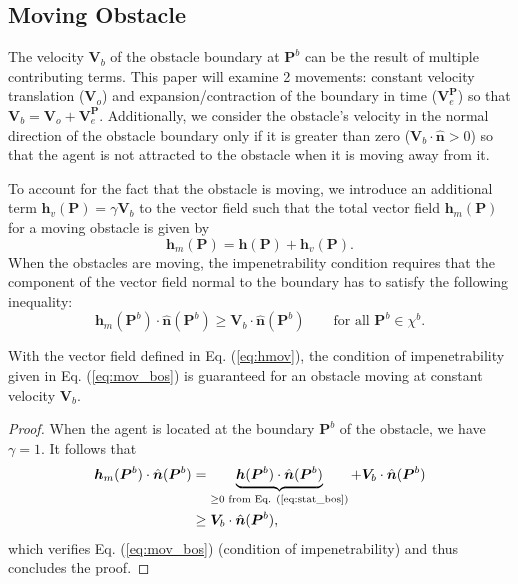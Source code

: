 \subsection{Moving Obstacle}

The velocity $\bm{V}_b$ of the obstacle boundary at $\bm{P}^b$ can be the result of multiple contributing terms. This paper will examine 2 movements: constant velocity translation ($\bm{V}_o$) and expansion/contraction of the boundary in time ($\bm{V}_e^{\bm{P}}$) so that $\bm{V}_b = \bm{V}_o + \bm{V}_e^{\bm{P}}$.
Additionally, we consider the obstacle’s velocity in the normal direction of the obstacle boundary only if it is greater than zero ($\bm{V}_b \cdot \hat{\bm{n}} > 0$) so that the agent is not attracted to the obstacle when it is moving away from it.

To account for the fact that the obstacle is moving, we introduce an additional term $\bm{h}_v(\bm{P})= \gamma \bm{V}_b$ to the vector field such that the total vector field $\bm{h}_m(\bm{P})$ for a moving obstacle is given by
\begin{equation} \label{eq:hmov}
    \bm{h}_m(\bm{P}) = \bm{h}(\bm{P}) + \bm{h}_v(\bm{P}).
\end{equation}
When the obstacles are moving, the impenetrability condition requires that the component of the vector field normal to the boundary has to satisfy the following inequality: 
\begin{equation}
\label{eq:mov_bos}
\bm{h}_m(\bm{P}^b) \cdot \hat{\bm{n}}(\bm{P}^b) \ge \bm{V}_b \cdot \hat{\bm{n}}(\bm{P}^b) \qquad \textrm{for all } \bm{P}^b \in \chi^b.
\end{equation}

\begin{proposition} \label{prop:imp_mov}
With the vector field defined in Eq. (\ref{eq:hmov}), the condition of impenetrability given in Eq. (\ref{eq:mov_bos}) is guaranteed for an obstacle moving at constant velocity $\bm{V}_b$.
\end{proposition}
\begin{proof}
When the agent is located at the boundary $\bm{P}^b$ of the obstacle, we have $\gamma = 1$. It follows that
\begin{align*}
    \bm{h}_m(\bm{P}^b) \cdot \hat{\bm{n}}(\bm{P}^b) &=  \underbrace{\bm{h}(\bm{P}^b) \cdot \hat{\bm{n}}(\bm{P}^b)}_{\ge 0 \textrm{ from Eq. (\ref{eq:stat_bos}})} + \bm{V}_b \cdot \hat{\bm{n}}(\bm{P}^b)  \\
    & \ge \bm{V}_b \cdot \hat{\bm{n}}(\bm{P}^b),
\end{align*}
which verifies Eq. (\ref{eq:mov_bos}) (condition of impenetrability) and thus concludes the proof.
\end{proof}

